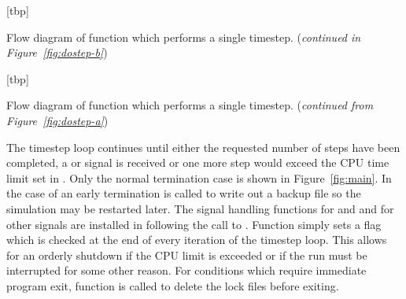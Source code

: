\documentclass[a4paper,twoside]{report}
\makeatletter
\newcounter{subfig}
\newenvironment{superfig}{%
\setcounter{subfig}{0}
\addtocounter{figure}{1}
}{\setcounter{subfig}{0}}
\newenvironment{partfigure}[1][tbp]{%
\addtocounter{subfig}{1}\addtocounter{figure}{-1}%
\@float{figure}[#1]%
\renewcommand{\thefigure}{\thechapter.\arabic{figure}(\alph{subfig})}%
}{\end@float}
\makeatother
\begin{document}
\begin{superfig}
\begin{partfigure}[tbp]
\begin{center}

\end{center}
\caption[Flow  diagram of function  which performs
a single timestep.]{Flow diagram of function  which
  performs a single timestep.  (\emph{continued in
    Figure~\ref{fig:dostep-b}})}
  \label{fig:dostep-a}
  
\end{partfigure}
\begin{partfigure}[tbp]
\begin{center}
  
\end{center}
\caption[Flow  diagram of function  which performs
a single timestep.]{Flow diagram of function  which
  performs a single timestep.  (\emph{continued from
    Figure~\ref{fig:dostep-a}})}
\label{fig:dostep-b}
\end{partfigure}
\end{superfig}

The timestep loop continues until either the requested number of steps
have been completed, a  or  signal is
received or one more step would exceed the CPU time limit set in
.  Only the normal termination case is shown
in Figure~\ref{fig:main}.  In the case of an early termination
 is called to write out a backup file so the
simulation may be restarted later.  The signal handling functions
 for  and  and
 for other signals are installed in 
following the call to .  Function 
simply sets a flag which is checked at the end of every iteration of
the timestep loop.  This allows for an orderly shutdown if the CPU
limit is exceeded or if the run must be interrupted for some other
reason. For conditions which require immediate program exit, function
 is called to delete the lock files before exiting.
\end{document}
